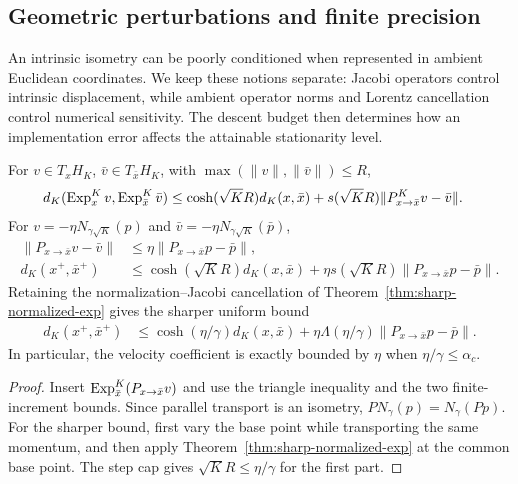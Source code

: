 \subsection{Geometric perturbations and finite precision}
An intrinsic isometry can be poorly conditioned when represented in ambient Euclidean coordinates. We keep these notions separate: Jacobi operators control intrinsic displacement, while ambient operator norms and Lorentz cancellation control numerical sensitivity. The descent budget then determines how an implementation error affects the attainable stationarity level.
\begin{proposition}
For $v\in T_xH_K$, $\bar v\in T_{\bar x}H_K$, with
$\max(\|v\|,\|\bar v\|)\le R$,
\begin{align}
 d_K(\operatorname{Exp}_x^Kv,\operatorname{Exp}_{\bar x}^K\bar v)
 &\le\cosh(\sqrt KR)d_K(x,\bar x)
 +s(\sqrt KR)\|P_{x\to\bar x}^Kv-\bar v\|.
\end{align}
For $v=-\eta N_{\gamma\sqrt K}(p)$ and $\bar v=-\eta N_{\gamma\sqrt K}(\bar p)$,
\begin{align}
 \|P_{x\to\bar x}v-\bar v\|
 &\le\eta\|P_{x\to\bar x}p-\bar p\|,\\
 d_K(x^+,\bar x^+)
 &\le\cosh(\sqrt KR)d_K(x,\bar x)
 +\eta s(\sqrt KR)\|P_{x\to\bar x}p-\bar p\|.
\end{align}
Retaining the normalization--Jacobi cancellation of Theorem~\ref{thm:sharp-normalized-exp} gives the sharper uniform bound
\begin{align}\label{eq:sharp-intrinsic-perturbation}
 d_K(x^+,\bar x^+)
 &\le\cosh(\eta/\gamma)d_K(x,\bar x)
 +\eta\Lambda(\eta/\gamma)\|P_{x\to\bar x}p-\bar p\|.
\end{align}
In particular, the velocity coefficient is exactly bounded by $\eta$ when $\eta/\gamma\le\alpha_c$.
\end{proposition}
\begin{proof}
Insert $\operatorname{Exp}_{\bar x}^K(P_{x\to\bar x}v)$ and use the triangle inequality and the two finite-increment bounds. Since parallel transport is an isometry,
$P N_\gamma(p)=N_\gamma(Pp)$. For the sharper bound, first vary the base point while transporting the same momentum, and then apply Theorem~\ref{thm:sharp-normalized-exp} at the common base point. The step cap gives $\sqrt KR\le\eta/\gamma$ for the first part.
\end{proof}

